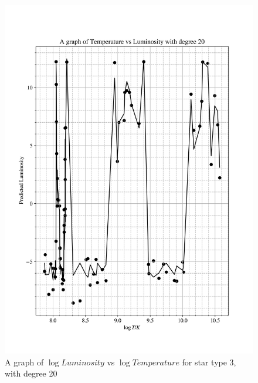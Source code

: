 \documentclass[12pt, a4paper]{article}
\begin{document}
\begin{figure}[H]
    \centering
    \includegraphics[width = \textwidth]{2Plot4_20.png}
    \caption{A graph of \(\log{Luminosity}\) vs \(\log{Temperature}\) for star type 3, with degree 20}
\end{figure}
\end{document}
